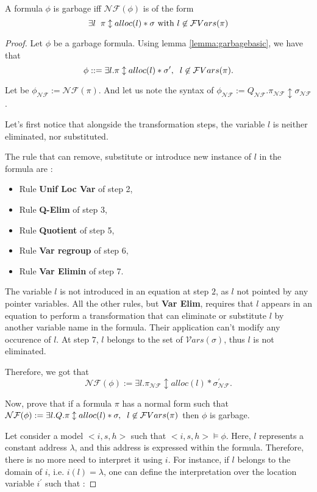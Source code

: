 \documentclass[a4paper,twoside,12pt]{report}
\newcommand{\syntaxeq}[0]{::=}
\newcommand{\Alloc}[1]{alloc(#1)}
\newcommand{\Unsep}[0]{\ast}
\newcommand{\Sep}[2]{#1 \Unsep #2}
\newcommand{\Formula}[2]{ #1  \updownarrow #2}
\newcommand{\NForm}[1]{\mathcal{NF}(#1)}
\newcommand{\Vars}[1]{\mathcal{V}ars(#1)}
\newcommand{\FVars}[1]{\mathcal{F}Vars(#1)}
\begin{document}
\begin{lemma}
\label{lemma:garbage}
A formula $\phi$ is garbage iff $\NForm{\phi}$ is of the form 
$$\exists l \gspace \Formula{\pi}{\Sep{\Alloc{l}}{\sigma}} \mbox{ with } l \not\in \FVars{\pi}$$
\end{lemma} 

\begin{proof}
Let $\phi$ be a garbage formula. Using lemma \ref{lemma:garbagebasic}, we have
that $$\phi \syntaxeq \exists l. \Formula{\pi}{\Sep{\Alloc{l}}{\sigma^{\prime}}}, \gspace l\not\in\FVars{\pi}.$$

Let be $\phi_{\mathcal{NF}}:=\NForm{\pi}$. And let us note the syntax of
$\phi_{\mathcal{NF}}:=Q_{\mathcal{NF}}.\Formula{\pi_{\mathcal{NF}}}{\sigma_{\mathcal{NF}}}$.

Let's first notice that alongside the transformation steps, the variable $l$
is neither eliminated, nor substituted.

The rule that can remove, substitute or introduce new instance of $l$ in the formula are :
\begin{itemize}
\item Rule \textbf{Unif Loc Var} of step 2,
\item Rule \textbf{Q-Elim} of step 3,
\item Rule \textbf{Quotient} of step 5,
\item Rule \textbf{Var regroup} of step 6,
\item Rule \textbf{Var Elimin} of step 7.
\end{itemize}

The variable $l$ is not introduced in an equation at step $2$, as $l$ not 
pointed by any pointer variables. All the other rules, but \textbf{Var Elim}, requires that $l$ appears in an equation to perform a transformation that can
eliminate or substitute $l$ by another variable name in the formula. Their 
application can't modify any occurence of $l$. At step $7$, $l$ belongs to 
the set of $\Vars{\sigma}$, thus $l$ is not eliminated.

Therefore, we got that $$\NForm{\phi}:=\exists l. \Formula{\pi_{\mathcal{NF}}}{\Sep{\Alloc{l}}{\sigma^{\prime}_{\mathcal{NF}}}}.$$

Now, prove that if a formula $\pi$ has a normal form such that $\NForm{\phi}:= \exists l.Q. \Formula{\pi}{\Sep{\Alloc{l}}{\sigma}}, \gspace l\not\in \FVars{\pi}$ then $\phi$ is garbage.

Let consider a model $<i,s,h>$ such that $<i,s,h> \models \phi$. 
Here, $l$ represents a constant address $\lambda$, and this address
is expressed within the formula. Therefore, there is no more need
to interpret it using $i$. For instance, if $l$ belongs to
the domain of $i$, i.e. $i(l)=\lambda$, one can define the interpretation
over the location variable $i^{\prime}$ such that :


\end{proof}
\end{document}
